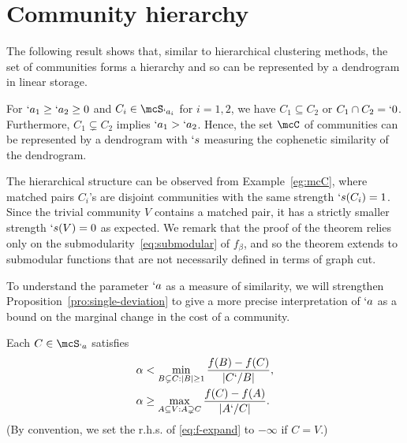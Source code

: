 
\section{Community hierarchy}
\label{sec:hierarchy}

The following result shows that, similar to hierarchical clustering methods, the set of communities
forms a hierarchy and so can be represented by a dendrogram in linear storage.

\begin{theorem}
  \label{thm:hierarchy}
  For $`a_1\geq `a_2\geq 0$ and $C_i\in \mcS_{`a_i}$ for $i=1,2$, we have $C_1\subseteq C_2$ or
  $C_1\cap C_2=`0$. Furthermore, $C_1\subsetneq C_2$ implies $`a_1>`a_2$. Hence, the set $\mcC$ of communities can be represented by a dendrogram with $`s$ measuring the cophenetic similarity of the dendrogram.
\end{theorem}

The hierarchical structure can be observed from Example~\ref{eg:mcC}, where matched pairs $C_i$'s
are disjoint communities with the same strength $`s(C_i)=1$. Since the trivial community $V$
contains a matched pair, it has a strictly smaller strength $`s(V)=0$ as expected.
We remark that the proof of the theorem relies only on the submodularity~\eqref{eq:submodular} of
$f_{\beta}$, and so the theorem extends to submodular functions that are not necessarily defined in
terms of graph cut. 

To understand the parameter $`a$ as a measure of similarity, we will strengthen
Proposition~\ref{pro:single-deviation} to give a more precise interpretation of $`a$ as a bound
on the marginal change in the cost of a community.
\begin{theorem}
  \label{thm:f-shrink-expand}
  Each $C\in \mcS_{`a}$ satisfies%
  \begin{subequations}
    \label{eq:f-shrink-expand}
    \begin{align}
      \label{eq:f-shrink}
      \alpha &< \min_{B\subsetneq C:|B|\geq 1} \frac{f(B) - f(C)}{|C`/ B|}, \\
      \label{eq:f-expand}
      \alpha &\geq \max_{A\subseteq V:A\supsetneq C} \frac{f(C) - f(A)}{|A`/ C|}. 
    \end{align}
  \end{subequations}
  (By convention, we set the r.h.s. of \eqref{eq:f-expand} to $-\infty$ if $C=V$.)
\end{theorem}

